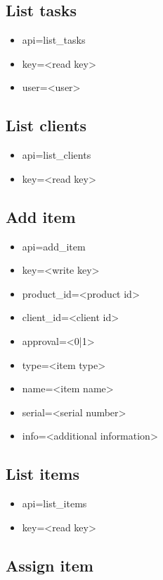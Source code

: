 \documentclass[11pt]{article}
\begin{document}
\subsection{List tasks}

\begin{itemize}
\item api=list\_tasks
\item key=<read key>
\item user=<user>
\end{itemize}

\subsection{List clients}

\begin{itemize}
\item api=list\_clients
\item key=<read key>
\end{itemize}

\subsection{Add item}

\begin{itemize}
\item api=add\_item
\item key=<write key>
\item product\_id=<product id>
\item client\_id=<client id>
\item approval=<0|1>
\item type=<item type>
\item name=<item name>
\item serial=<serial number>
\item info=<additional information>
\end{itemize}

\subsection{List items}

\begin{itemize}
\item api=list\_items
\item key=<read key>
\end{itemize}

\subsection{Assign item}
\end{document}
